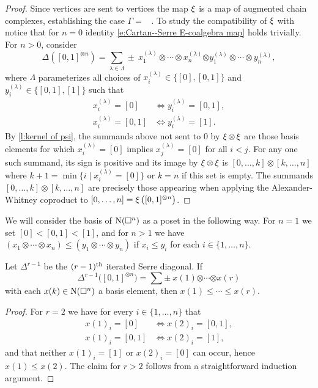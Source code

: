 \begin{proof}
	Since vertices are sent to vertices the map $\operatorname{\xi}$ is a map of augmented chain complexes, establishing the case $\Gamma =$ \counit \ .
	To study the compatibility of $\operatorname{\xi}$ with \coproduct \, notice that for $n=0$ identity \eqref{e:Cartan--Serre E-coalgebra map} holds trivially.
	For $n > 0$, consider
	\[
	\Delta([0,1]^{\otimes n}) = \sum_{\lambda \in \Lambda} \pm \ x_1^{(\lambda)} \otimes \cdots \otimes x_n^{(\lambda)} \bm{\otimes} y_1^{(\lambda)} \otimes \cdots \otimes y_n^{(\lambda)},
	\]
	where $\Lambda$ parameterizes all choices of $x_i^{(\lambda)} \in \{[0], [0,1]\}$ and $y_i^{(\lambda)} \in \{[0,1], [1]\}$ such that
	\begin{align*}
	x_i^{(\lambda)} = [0]   & \iff y_i^{(\lambda)} = [0,1], \\
	x_i^{(\lambda)} = [0,1] & \iff y_i^{(\lambda)} = [1].
	\end{align*}
	By \cref{l:kernel of psi}, the summands above not sent to $0$ by $\operatorname{\xi} \otimes \operatorname{\xi}$ are those basis elements for which $x_i^{(\lambda)} = [0]$ implies $x_j^{(\lambda)} = [0]$ for all $i < j$.
	For any one such summand, its sign is positive and its image by $\operatorname{\xi} \otimes \operatorname{\xi}$ is $[0, \dots, k] \otimes [k, \dots, n]$ where $k+1 = \min \{i \mid x_i^{(\lambda)} = [0]\}$ or $k = n$ if this set is empty.
	The summands $[0, \dots, k] \otimes [k, \dots, n]$ are precisely those appearing when applying the Alexander-Whitney coproduct to $[0, \dots, n] = \operatorname{\xi} \big( [0,1]^{\otimes n} \big)$.
\end{proof}

We will consider the basis of $\operatorname{N}(\square^n)$ as a poset in the following way.
For $n = 1$ we set $[0] < [0,1] < [1]$, and for $n > 1$ we have $(x_1 \otimes \cdots \otimes x_n) \leq (y_1 \otimes \cdots \otimes y_n)$ if $x_i \leq y_i$ for each $i \in \{1, \dots, n\}$.

\begin{lemma}
	Let $\Delta^{r-1}$ be the $(r-1)^{\mathrm{th}}$ iterated Serre diagonal.
	If
	\[
	\Delta^{r-1} \big([0,1]^{\otimes n}\big) =
	\sum \pm \ x{(1)} \bm{\otimes} \cdots \bm{\otimes} x{(r)}
	\]
	with each $x(k) \in \operatorname{N}(\square^n)$ a basis element, then $x{(1)} \leq \cdots \leq x{(r)}$.
\end{lemma}

\begin{proof}
	For $r = 2$ we have for every $i \in \{1, \dots, n\}$ that
	\begin{align*}
	x(1)_i = [0]   & \iff x(2)_i = [0,1], \\
	x(1)_i = [0,1] & \iff x(2)_i = [1],
	\end{align*}
	and that neither $x(1)_i = [1]$ or $x(2)_i = [0]$ can occur, hence $x(1) \leq x(2)$.
	The claim for $r > 2$ follows from a straightforward induction argument.
\end{proof}

